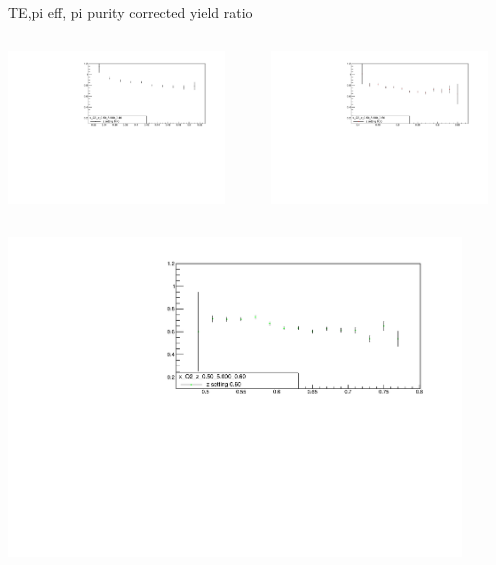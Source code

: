 \begin{frame}{TE,pi eff, pi purity corrected yield ratio}
\begin{columns}
\begin{column}[T]{0.5\textwidth}
\includegraphics[width = 0.9\textwidth]{results/yield/statistics_corr/x_Q2_z_0.50_5.000_0.40_ratio.pdf}
\end{column}
\begin{column}[T]{0.5\textwidth}
\includegraphics[width = 0.9\textwidth]{results/yield/statistics_corr/x_Q2_z_0.50_5.000_0.50_ratio.pdf}
\end{column}
\end{columns}
\begin{columns}
\begin{column}[T]{0.5\textwidth}
\includegraphics[width = 0.9\textwidth]{results/yield/statistics_corr/x_Q2_z_0.50_5.000_0.60_ratio.pdf}

\end{column}
\end{columns}
\end{frame}
